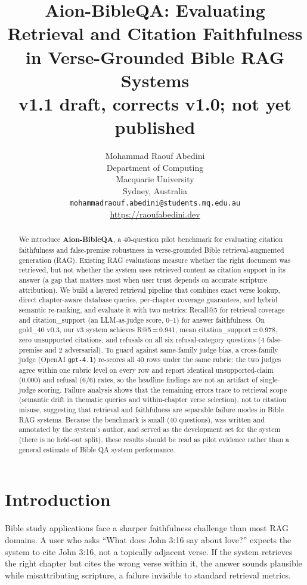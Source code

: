 \documentclass[11pt]{article}
\title{Aion-BibleQA: Evaluating Retrieval and Citation Faithfulness\\
       in Verse-Grounded Bible RAG Systems\\[4pt]
       {\normalsize\normalfont v1.1 draft, corrects v1.0; not yet published}}
\author{Mohammad Raouf Abedini\\
  Department of Computing\\
  Macquarie University\\
  Sydney, Australia\\
  \texttt{mohammadraouf.abedini@students.mq.edu.au}\\
  \url{https://raoufabedini.dev}}
\begin{document}
\maketitle

\begin{abstract}
We introduce \textbf{Aion-BibleQA}, a 40-question pilot benchmark for evaluating citation faithfulness and false-premise robustness in verse-grounded Bible retrieval-augmented generation (RAG).
Existing RAG evaluations measure whether the right document was retrieved, but not whether the system uses retrieved content as citation support in its answer (a gap that matters most when user trust depends on accurate scripture attribution).
We build a layered retrieval pipeline that combines exact verse lookup, direct chapter-aware database queries, per-chapter coverage guarantees, and hybrid semantic re-ranking, and evaluate it with two metrics: Recall@5 for retrieval coverage and citation\_support (an LLM-as-judge score, 0--1) for answer faithfulness.
On gold\_40 v0.3, our v3 system achieves R@5\,=\,0.941, mean citation\_support\,=\,0.978, zero unsupported citations, and refusals on all six refusal-category questions (4 false-premise and 2 adversarial).
To guard against same-family judge bias, a cross-family judge (OpenAI \texttt{gpt-4.1}) re-scores all 40 rows under the same rubric: the two judges agree within one rubric level on every row and report identical unsupported-claim (0.000) and refusal (6/6) rates, so the headline findings are not an artifact of single-judge scoring.
Failure analysis shows that the remaining errors trace to retrieval scope (semantic drift in thematic queries and within-chapter verse selection), not to citation misuse, suggesting that retrieval and faithfulness are separable failure modes in Bible RAG systems.
Because the benchmark is small (40 questions), was written and annotated by the system's author, and served as the development set for the system (there is no held-out split), these results should be read as pilot evidence rather than a general estimate of Bible QA system performance.
\end{abstract}

\section{Introduction}

Bible study applications face a sharper faithfulness challenge than most RAG domains.
A user who asks ``What does John 3:16 say about love?'' expects the system to cite John 3:16, not a topically adjacent verse.
If the system retrieves the right chapter but cites the wrong verse within it, the answer sounds plausible while misattributing scripture, a failure invisible to standard retrieval metrics.
\end{document}
